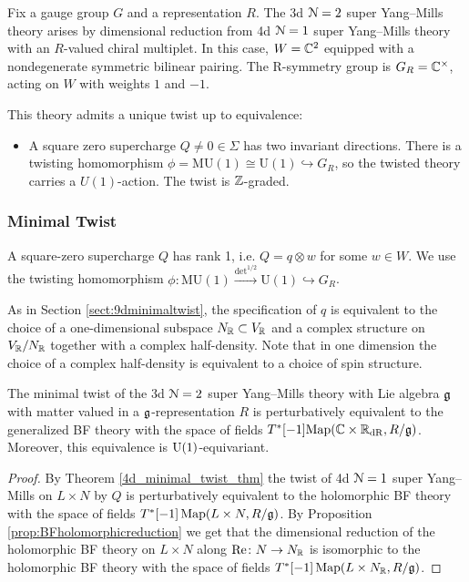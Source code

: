 \documentclass[10pt, oneside]{article}
\newcommand{\MU}{\mathrm{MU}}
\renewcommand{\Re}{\mathrm{Re}}
\renewcommand{\U}{\mathrm{U}}
\begin{document}
Fix a gauge group $G$ and a representation $R$.  The 3d $\mathcal{N}=2$ super Yang--Mills theory arises by dimensional reduction from 4d $\mathcal{N}=1$ super Yang--Mills theory with an $R$-valued chiral multiplet.  In this case, $W = \mathbb C^2$ equipped with a nondegenerate symmetric bilinear pairing. The R-symmetry group is $G_R=\mathbb C^\times$, acting on $W$ with weights $1$ and $-1$.

This theory admits a unique twist up to equivalence:
\begin{itemize}
 \item A square zero supercharge $Q \ne 0 \in \Sigma$ has two invariant directions.  There is a twisting homomorphism $\phi = \MU(1)\cong \U(1)\hookrightarrow G_R$, so the twisted theory carries a $U(1)$-action. The twist is $\mathbb Z$-graded.
\end{itemize}

\subsubsection{Minimal Twist}
\label{sect:3dminimaltwist}
A square-zero supercharge $Q$ has rank 1, i.e. $Q = q \otimes w$ for some $w \in W$. We use the twisting homomorphism $\phi\colon \MU(1)\xrightarrow{\det^{1/2}} \U(1)\hookrightarrow G_R$.

As in Section \ref{sect:9dminimaltwist}, the specification of $q$ is equivalent to the choice of a one-dimensional subspace $N_\mathbb R\subset V_\mathbb R$ and a complex structure on $V_\mathbb R/N_\mathbb R$ together with a complex half-density.  Note that in one dimension the choice of a complex half-density is equivalent to a choice of spin structure.

\begin{theorem} \label{3d_minimal_twist_thm}
The minimal twist of the 3d $\mathcal N=2$ super Yang--Mills theory with Lie algebra $\mathfrak g$ with matter valued in a $\mathfrak g$-representation $R$ is perturbatively equivalent to the generalized BF theory with the space of fields $T^*[-1]\mathrm{Map}(\mathbb C \times \mathbb R_{\mathrm{dR}}, R/\mathfrak{g})$. Moreover, this equivalence is $\mathrm{U}(1)$-equivariant.
\end{theorem}

\begin{proof}
By Theorem \ref{4d_minimal_twist_thm} the twist of 4d $\mathcal N=1$ super Yang--Mills on $L\times N$ by $Q$ is perturbatively equivalent to the holomorphic BF theory with the space of fields $T^*[-1]\operatorname{Map}(L\times N, R / \mathfrak g)$. By Proposition \ref{prop:BFholomorphicreduction} we get that the dimensional reduction of the holomorphic BF theory on $L\times N$ along $\Re\colon N\rightarrow N_\RR$ is isomorphic to the holomorphic BF theory with the space of fields $T^*[-1]\operatorname{Map}(L\times N_\mathbb R, R/\mathfrak g)$.
\end{proof}
\end{document}
